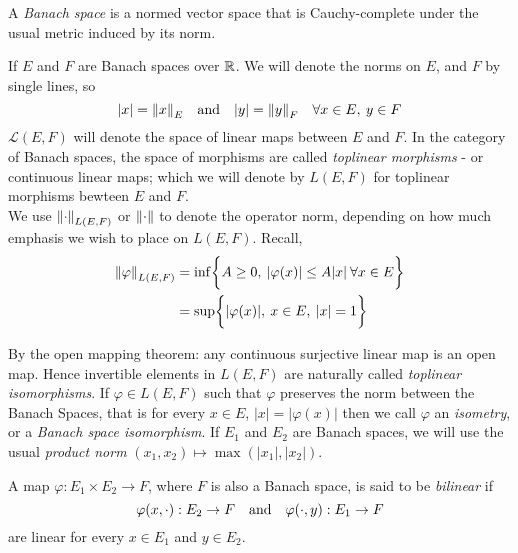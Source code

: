 \documentclass[../main-manifolds.tex]{subfiles}
\begin{document}
\newpage
{}
A \emph{Banach space} is a normed vector space that is Cauchy-complete under the usual metric induced by its norm. 

If $E$ and $F$ are Banach spaces over $\mathbb{R}$. We will denote the norms on $E$, and $F$ by single lines, so 
\[
    \vert x\vert = \norm{x}_E\qqtext{and} \vert y\vert = \norm{y}_F\quad\forall x\in E,\: y\in F
\]
$\mathcal{L}(E,F)$ will denote the space of linear maps between $E$ and $F$. In the category of Banach spaces, the space of morphisms are called \emph{toplinear morphisms} - or continuous linear maps; which we will denote by $L(E,F)$ for toplinear morphisms bewteen $E$ and $F$. \\

We use $\norm{\cdot}_{L(E,F)}$ or $\norm{\cdot}$ to denote the operator norm, depending on how much emphasis we wish to place on $L(E,F)$. Recall,
\begin{align*}
\norm{\varphi}_{L(E,F)} &= \inf\biggl\{{A\geq 0,\: \vert\varphi(x)\vert\leq A\vert x\vert\:\forall x\in E}\biggr\}\\
&= \sup\biggl\{{\vert\varphi(x)\vert,\: x\in E,\: \vert x\vert=1}\biggr\}
\end{align*}

By the open mapping theorem: any continuous surjective linear map is an open map. Hence invertible elements in $L(E,F)$ are naturally called \emph{toplinear isomorphisms}. If $\varphi\in L(E,F)$ such that $\varphi$ preserves the norm between the Banach Spaces, that is for every $x\in E$, $\vert x\vert = \vert \varphi(x)\vert$ then we call $\varphi$ an \emph{isometry}, or a \emph{Banach space isomorphism}. If $E_1$ and $E_2$ are Banach spaces, we will use the usual \emph{product norm} $(x_1, x_2)\mapsto \max(\vert x_1\vert,\vert x_2\vert)$. 
\begin{definition}
A map $\varphi: E_1\times E_2\to F$, where $F$ is also a Banach space, is said to be \emph{bilinear} if
\[
    \varphi(x,\cdot): E_2\to F\qqtext{and}\varphi(\cdot,y): E_1\to F
\]
are linear for every $x\in E_1$ and $y\in E_2$.     
\end{definition}
\end{document}
